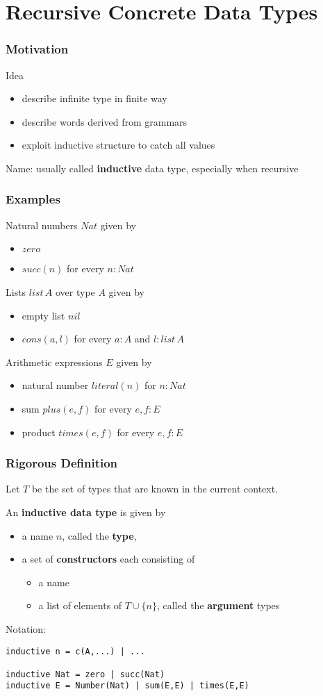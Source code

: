 \section{Recursive Concrete Data Types}

\begin{frame}\frametitle{Motivation}
Idea
\begin{itemize}
\item describe infinite type in finite way
\item describe words derived from grammars
\item exploit inductive structure to catch all values
\end{itemize}

Name: usually called \textbf{inductive} data type, especially when recursive
\end{frame}

\begin{frame}\frametitle{Examples}
Natural numbers $Nat$ given by
\begin{itemize}
\item $zero$
\item $succ(n)$ for every $n:Nat$
\end{itemize}

Lists $list\,A$ over type $A$ given by
\begin{itemize}
\item empty list $nil$
\item $cons(a,l)$ for every $a:A$ and $l:list\,A$
\end{itemize}

Arithmetic expressions $E$ given by
\begin{itemize}
\item natural number $literal(n)$ for $n:Nat$
\item sum $plus(e,f)$ for every $e,f:E$
\item product $times(e,f)$ for every $e,f:E$
\end{itemize}
\end{frame}

\begin{frame}[fragile]\frametitle{Rigorous Definition}
Let $T$ be the set of types that are known in the current context.

An \textbf{inductive data type} is given by
\begin{itemize}
 \item a name $n$, called the \textbf{type},
 \item a set of \textbf{constructors} each consisting of
 \begin{itemize}
  \item a name
  \item a list of elements of $T\cup\{n\}$, called the \textbf{argument} types
 \end{itemize} 
\end{itemize}

Notation:
\begin{lstlisting}
inductive n = c(A,...) | ...

inductive Nat = zero | succ(Nat)
inductive E = Number(Nat) | sum(E,E) | times(E,E)
\end{lstlisting}
\end{frame}

